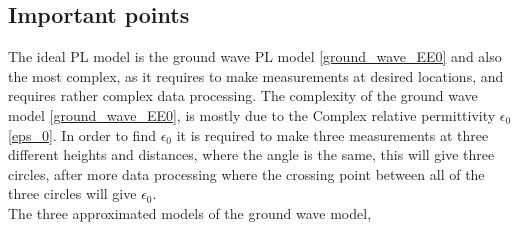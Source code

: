 \subsection{Important points}
The ideal PL model is the ground wave PL model \eqref{ground_wave_EE0} and also the most complex, as it requires to make measurements at desired locations, and requires rather complex data processing. The complexity of the ground wave model \eqref{ground_wave_EE0}, is mostly due to the Complex relative permittivity $\epsilon_{0}$ \eqref{eps_0}. In order to find $\epsilon_{0}$ it is required to make three measurements at three different heights and distances, where the angle is the same, this will give three circles, after more data processing where the crossing point between all of the three circles will give $\epsilon_{0}$.  \\

The three approximated models of the ground wave model, 

